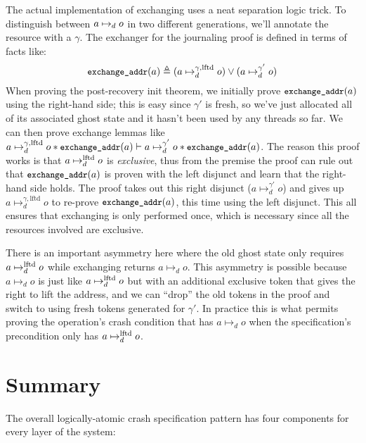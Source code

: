 The actual implementation of exchanging uses a neat separation logic trick. To
distinguish between $a \mapsto_d o$ in two different generations, we'll
annotate the resource with a $\gamma$. The exchanger for the journaling proof is
defined in terms of facts like:
\[
  \cc{exchange_addr}(a) \defeq (a \mapsto^{\gamma, \mathrm{lftd}}_{d} o) \lor (a \mapsto^{\gamma'}_{d} o)
\]
When proving the post-recovery init theorem, we initially prove
$\cc{exchange_addr}(a)$ using the right-hand side; this is easy since $\gamma'$
is fresh, so we've just allocated all of its associated ghost state and it
hasn't been used by any threads so far. We can then prove exchange lemmas like
$a \mapsto^{\gamma, \mathrm{lftd}}_{d} o \sep \cc{exchange_addr}(a) \proves a \mapsto^{\gamma'}_{d} o \sep \cc{exchange_addr}(a)$.
The reason this proof works is that $a \mapsto_d^{\mathrm{lftd}} o$ is \emph{exclusive}, thus
from the premise the proof can rule out that $\cc{exchange_addr}(a)$ is proven with the
left disjunct and learn that the right-hand side holds. The proof takes out this
right disjunct ($a \mapsto^{\gamma'}_{d} o$) and gives up
$a \mapsto^{\gamma, \mathrm{lftd}}_{d} o$ to re-prove $\cc{exchange_addr}(a)$, this time using
the left disjunct. This all ensures that exchanging is only performed once,
which is necessary since all the resources involved are exclusive.

There is an important asymmetry here where the old ghost state only requires
$a \mapsto_d^{\mathrm{lftd}} o$ while exchanging returns $a \mapsto_{d} o$. This asymmetry is
possible because $a \mapsto_{d} o$ is just like $a \mapsto_d^{\mathrm{lftd}} o$ but with an
additional exclusive token that gives the right to lift the address, and we can
``drop'' the old tokens in the proof and switch to using fresh tokens generated
for $\gamma'$. In practice this is what permits proving the 
operation's crash condition that has $a \mapsto_{d} o$ when the specification's
precondition only has $a \mapsto_d^{\mathrm{lftd}} o$.


\section{Summary}

The overall logically-atomic crash specification pattern has four components for
every layer of the system:

